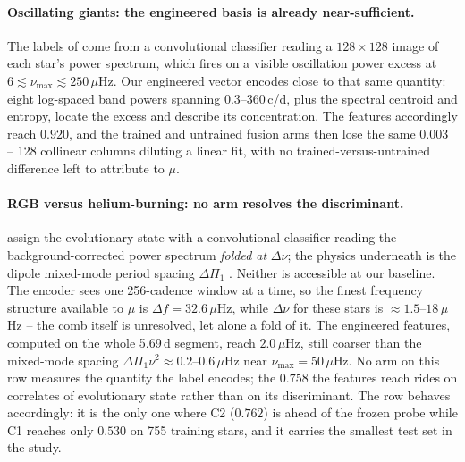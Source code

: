 \documentclass{article}
\begin{document}
\paragraph{Oscillating giants: the engineered basis is already near-sufficient.} The labels of
\citet{hon2021} come from a convolutional classifier reading a $128 \times 128$ image of each star's
power spectrum, which fires on a visible oscillation power excess at
$6 \lesssim \nu_{\max} \lesssim 250\,\mu$Hz. Our engineered vector encodes close to that same
quantity: eight log-spaced band powers spanning 0.3--360\,c/d, plus the spectral centroid and
entropy, locate the excess and describe its concentration. The features accordingly reach $0.920$,
and the trained and untrained fusion arms then lose the same $0.003$ -- 128 collinear columns
diluting a linear fit, with no trained-versus-untrained difference left to attribute to $\mu$.

\paragraph{RGB versus helium-burning: no arm resolves the discriminant.} \citet{sreenivas2026} assign
the evolutionary state with a convolutional classifier reading the background-corrected power spectrum
\emph{folded at} $\Delta\nu$; the physics underneath is the dipole mixed-mode period spacing
$\Delta\Pi_{1}$ \citep{bedding2011}. Neither is accessible at our baseline. The encoder sees one
256-cadence window at a time, so the finest frequency structure available to $\mu$ is
$\Delta f = 32.6\,\mu$Hz, while $\Delta\nu$ for these stars is $\approx 1.5$--$18\,\mu$Hz -- the comb
itself is unresolved, let alone a fold of it. The engineered features, computed on the whole 5.69\,d
segment, reach $2.0\,\mu$Hz, still coarser than the mixed-mode spacing
$\Delta\Pi_{1}\nu^{2} \approx 0.2$--$0.6\,\mu$Hz near $\nu_{\max} = 50\,\mu$Hz. No arm on this row
measures the quantity the label encodes; the $0.758$ the features reach rides on correlates of
evolutionary state rather than on its discriminant. The row behaves accordingly: it is the only one
where C2 ($0.762$) is ahead of the frozen probe while C1 reaches only $0.530$ on 755 training stars,
and it carries the smallest test set in the study.
\end{document}
